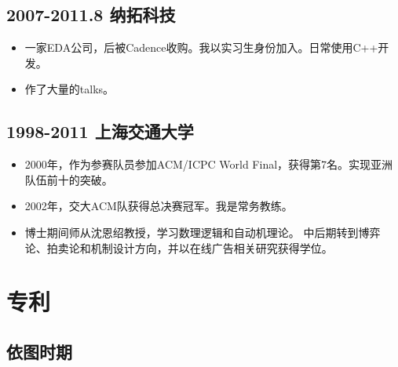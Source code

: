\documentclass[scheme=plain]{ctexart}
\begin{document}
\subsection*{2007-2011.8 纳拓科技}

\begin{itemize}
    \item 一家EDA公司，后被Cadence收购。我以实习生身份加入。日常使用C++开发。
    \item 作了大量的talks。
\end{itemize}

\subsection*{1998-2011 上海交通大学}

\begin{itemize}
    \item 2000年，作为参赛队员参加ACM/ICPC World Final，获得第7名。实现亚洲队伍前十的突破。
    \item 2002年，交大ACM队获得总决赛冠军。我是常务教练。
    \item 博士期间师从沈恩绍教授，学习数理逻辑和自动机理论。
        中后期转到博弈论、拍卖论和机制设计方向，并以在线广告相关研究获得学位。
\end{itemize}

\appendix
\clearpage
\section{专利}

\subsection*{依图时期}
\end{document}
